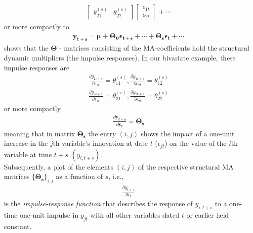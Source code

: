 \documentclass[a4paper,11pt,listof=nochaptergap,oneside,pointednumbers,bibtotoc,bigheadings,liststotoc]{scrbook}
\theoremstyle{mysatz}
\theoremstyle{mydefinition}
\theoremstyle{mybemerkung}
\newcommand{\vect}[1]{\boldsymbol{\mathbf{#1}}}
\begin{document}
\begin{itemize}
\begin{equation}
\begin{split}
\begin{bmatrix}
    	\theta_{21}^{(s)} & \theta_{22}^{(s)}
 	\end{bmatrix} 
	\begin{bmatrix}
    	\epsilon_{1t} \\
	\epsilon_{2t}
 	\end{bmatrix} + \cdots 
\end{split}								
\end{equation}
or more compactly to 
\begin{equation} \label{eq:svar8_1}
\begin{split}
 		\vect{y_{t+s}} = \vect{\mu} + \vect{\Theta_0}\vect{\epsilon_{t+s}} + \cdots + \vect{\Theta_s}\vect{\epsilon_{t}} + \cdots
\end{split}								
\end{equation}
shows that the $\vect{\Theta}$ - matrices consisting of the MA-coefficients hold the structural dynamic multipliers (the impulse responses). In our bivariate example, these impulse responses are
\begin{equation} \label{eq:svar9}
\begin{split}
 		\frac{\partial y_{1t+s}}{\partial \epsilon_{1t}} = \theta_{11}^{(s)}, \frac{\partial y_{1t+s}}{\partial \epsilon_{2t}} = \theta_{12}^{(s)} \\
		\frac{\partial y_{2t+s}}{\partial \epsilon_{1t}} = \theta_{21}^{(s)}, \frac{\partial y_{2t+s}}{\partial \epsilon_{2t}} = \theta_{22}^{(s)}
\end{split}								
\end{equation}
or more compactly 
\begin{equation} \label{eq:svar10}
\begin{split}
 		\frac{\partial \vect{y_{t+s}}}{\partial \vect{\epsilon_{t}}} =  \vect{\Theta_s}
\end{split}								
\end{equation}
meaning that in matrix $\vect{\Theta_s}$ the entry $(i, j)$ shows the impact of a one-unit increase in the $j$th variable's innovation at date $t$ ($\epsilon_{jt}$) on the value of the $i$th variable at time $t+s$ $(y_{i, t + s})$.\\
Subsequently, a plot of the elements $(i, j)$ of the respective structural MA matrices $\{\vect{\Theta_s}\}_{i, j}$ as a function of $s$, i.e., 
\begin{equation} \label{eq:svar10}
\begin{split}
 		\frac{\partial y_{t+s}}{\partial \epsilon_{t}}
\end{split}								
\end{equation}
is the \textit{impulse-response function} that describes the response of $y_{i, t+s}$ to a one-time one-unit impulse in $y_{jt}$ with all other variables dated $t$ or earlier held constant.




\end{itemize}
\end{document}
